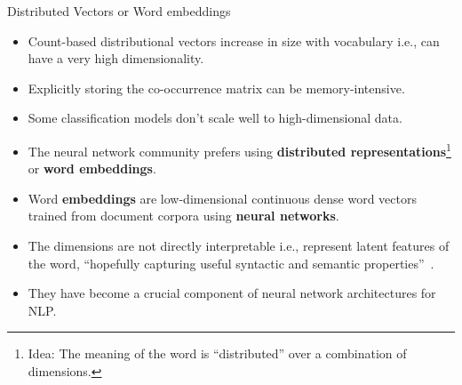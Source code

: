 \documentclass[handout]{beamer}
\begin{document}
\begin{frame}{Distributed Vectors or Word embeddings}
\begin{scriptsize}
\begin{itemize}

\item Count-based distributional vectors increase in size with vocabulary i.e., can have a very high dimensionality.

\item Explicitly storing the co-occurrence matrix can be memory-intensive. 

\item Some classification models don't scale well to high-dimensional data.

\item  The neural network community prefers using \textbf{distributed representations}\footnote{Idea: The meaning of the word is ``distributed'' over a combination of dimensions.} or \textbf{word embeddings}.

\item  Word \textbf{embeddings} are low-dimensional continuous dense word vectors trained from document corpora using \textbf{neural networks}.

\item The dimensions are not directly interpretable i.e., represent latent features of  the  word,  ``hopefully capturing useful syntactic and semantic properties''~\cite{turian2010word}.

\item They have become a crucial component of neural network architectures for NLP.


\end{itemize}
\end{scriptsize}
\end{frame}
\end{document}
